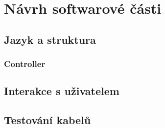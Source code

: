 
\section{Návrh softwarové části}

\subsection{Jazyk a struktura}
\newpage
\subsubsection{Controller}


\subsection{Interakce s uživatelem}
\subsection{Testování kabelů}